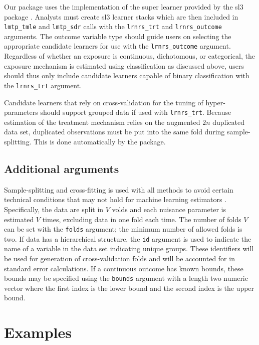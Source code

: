 \documentclass[twoside,11pt]{article}
\newcommand{\pkg}[1]{{\fontseries{b}\selectfont #1}}
\let\code=\texttt
\begin{document}
Our package uses the implementation of the super learner provided by the \pkg{sl3} package \citep{coyleSl3}. Analysts must create \pkg{sl3} learner stacks which are then included in \code{lmtp\_tmle} and \code{lmtp\_sdr} calls with the \code{lrnrs\_trt} and \code{lrnrs\_outcome} arguments. The outcome variable type should guide users on selecting the appropriate candidate learners for use with the \code{lrnrs\_outcome} argument. Regardless of whether an exposure is continuous, dichotomous, or categorical, the exposure mechanism is estimated using classification as discussed above, users should thus only include candidate learners capable of binary classification with the \code{lrnrs\_trt} argument.

Candidate learners that rely on cross-validation for the tuning of hyper-parameters should support grouped data if used with \code{lrnrs\_trt}. Because estimation of the treatment mechanism relies on the augmented $2n$ duplicated data set, duplicated observations must be put into the same fold during sample-splitting. This is done automatically by the package.

\hypertarget{additional-arguments}{\subsection{Additional arguments}\label{additional-arguments}}

Sample-splitting and cross-fitting is used with all methods to avoid certain technical conditions that may not hold for machine learning estimators \citep{zhengCrossValidatedTargetedMinimumLossBased2011b,chernozhukovDoubleDebiasedMachine2018}. Specifically, the data are split in $V$ volds and each nuisance parameter is estimated $V$ times, excluding data in one fold each time. The number of folds $V$ can be set with the \code{folds} argument; the minimum number of allowed folds is two.  If data has a hierarchical structure, the \code{id} argument is used to indicate the name of a variable in the data set indicating unique groups. These identifiers will be used for generation of cross-validation folds and will be accounted for in standard error calculations. If a continuous outcome has known bounds, these bounds may be specified using the \code{bounds} argument with a length two numeric vector where the first index is the lower bound and the second index is the upper bound.

\hypertarget{examples}{\section{Examples}\label{examples}}
\end{document}
